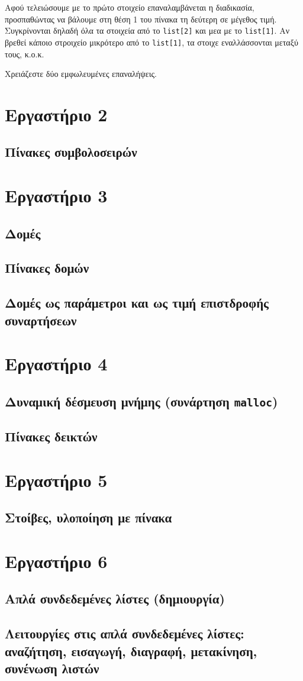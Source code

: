 \documentclass[14pt, fleqn, leqno]{extreport}
\begin{document}
Αφού τελειώσουμε με το πρώτο στοιχείο επαναλαμβάνεται η διαδικασία, προσπαθώντας να βάλουμε στη θέση 1 του πίνακα τη δεύτερη σε μέγεθος τιμή. Συγκρίνονται δηλαδή όλα τα στοιχεία από το \lstinline{list[2]} και μεα με το \lstinline{list[1]}. Αν βρεθεί κάποιο στροιχείο μικρότερο από το \lstinline{list[1]}, τα στοιχε εναλλάσσονται μεταξύ τους, κ.ο.κ.

Χρειάζεστε δύο εμφωλευμένες επαναλήψεις.

\chapter{Εργαστήριο 2}

\section{Πίνακες συμβολοσειρών}

\chapter{Εργαστήριο 3}

\section{Δομές}
\section{Πίνακες δομών}
\section{Δομές ως παράμετροι και ως τιμή επιστδροφής συναρτήσεων}

\chapter{Εργαστήριο 4}

\section{Δυναμική δέσμευση μνήμης (συνάρτηση \lstinline{malloc})}
\section{Πίνακες δεικτών}

\chapter{Εργαστήριο 5}

\section{Στοίβες, υλοποίηση με πίνακα}

\chapter{Εργαστήριο 6}

\section{Απλά συνδεδεμένες λίστες (δημιουργία)}
\section{Λειτουργίες στις απλά συνδεδεμένες λίστες: αναζήτηση, εισαγωγή, διαγραφή, μετακίνηση, συνένωση λιστών}
\end{document}
